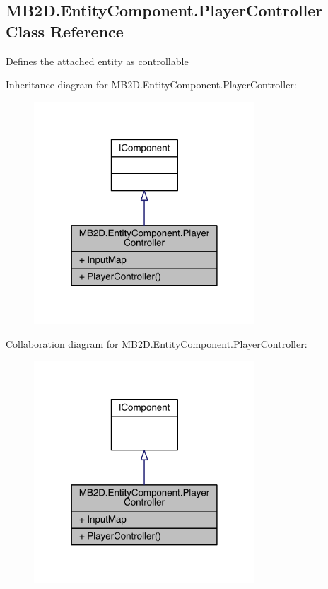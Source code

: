 \hypertarget{class_m_b2_d_1_1_entity_component_1_1_player_controller}{}\subsection{M\+B2\+D.\+Entity\+Component.\+Player\+Controller Class Reference}
\label{class_m_b2_d_1_1_entity_component_1_1_player_controller}


Defines the attached entity as controllable  




Inheritance diagram for M\+B2\+D.\+Entity\+Component.\+Player\+Controller\+:
\nopagebreak
\begin{figure}[H]
\begin{center}
\leavevmode
\includegraphics[width=234pt]{class_m_b2_d_1_1_entity_component_1_1_player_controller__inherit__graph}
\end{center}
\end{figure}


Collaboration diagram for M\+B2\+D.\+Entity\+Component.\+Player\+Controller\+:
\nopagebreak
\begin{figure}[H]
\begin{center}
\leavevmode
\includegraphics[width=234pt]{class_m_b2_d_1_1_entity_component_1_1_player_controller__coll__graph}
\end{center}
\end{figure}
